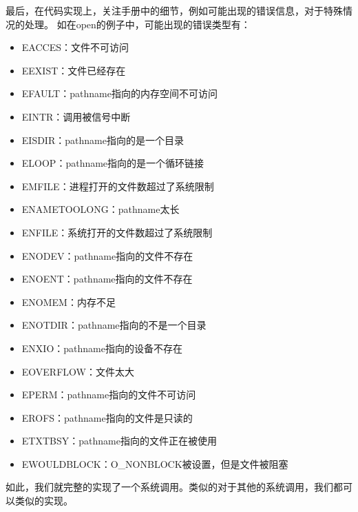 最后，在代码实现上，关注手册中的细节，例如可能出现的错误信息，对于特殊情况的处理。
如在open的例子中，可能出现的错误类型有：
\begin{itemize}
    \item EACCES：文件不可访问
    \item EEXIST：文件已经存在
    \item EFAULT：pathname指向的内存空间不可访问
    \item EINTR：调用被信号中断
    \item EISDIR：pathname指向的是一个目录
    \item ELOOP：pathname指向的是一个循环链接
    \item EMFILE：进程打开的文件数超过了系统限制
    \item ENAMETOOLONG：pathname太长
    \item ENFILE：系统打开的文件数超过了系统限制
    \item ENODEV：pathname指向的文件不存在
    \item ENOENT：pathname指向的文件不存在
    \item ENOMEM：内存不足
    \item ENOTDIR：pathname指向的不是一个目录
    \item ENXIO：pathname指向的设备不存在
    \item EOVERFLOW：文件太大
    \item EPERM：pathname指向的文件不可访问
    \item EROFS：pathname指向的文件是只读的
    \item ETXTBSY：pathname指向的文件正在被使用
    \item EWOULDBLOCK：O\_NONBLOCK被设置，但是文件被阻塞
\end{itemize}

如此，我们就完整的实现了一个系统调用。类似的对于其他的系统调用，我们都可以类似的实现。